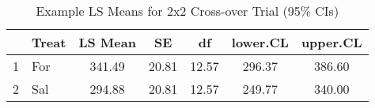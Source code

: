 \begin{table}[ht]
\centering
\begin{tabular}{rl|ccccc}
  \hline
 & Treat & LS Mean & SE & df & lower.CL & upper.CL \\ 
  \hline
1 & For & 341.49 & 20.81 & 12.57 & 296.37 & 386.60 \\ 
  2 & Sal & 294.88 & 20.81 & 12.57 & 249.77 & 340.00 \\ 
   \hline
\end{tabular}
\caption{Example LS Means for 2x2 Cross-over Trial (95\% CIs)} 
\label{lsMeansTable}
\end{table}

